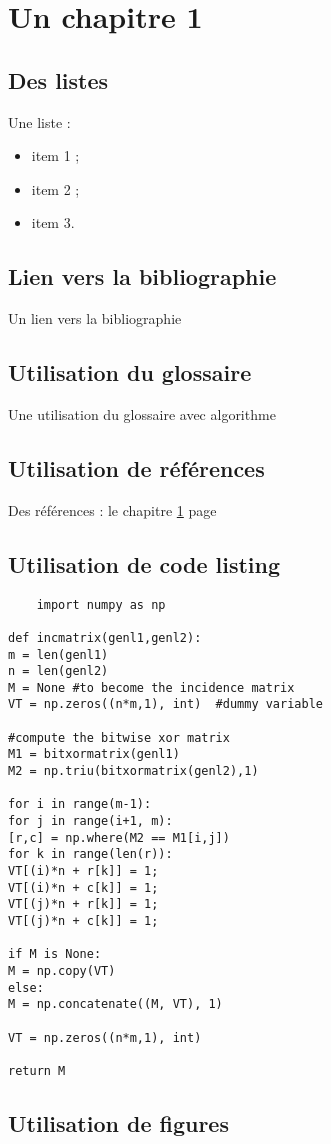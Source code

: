 \chapter{Un chapitre 1}
\label{ch:chapitre 1}

\section{Des listes}

Une liste :
\begin{itemize}
    \item item 1 ;
    \item item 2 ;
    \item item 3.
\end{itemize}

\section{Lien vers la bibliographie}

Un lien vers la bibliographie

\section{Utilisation du glossaire}

Une utilisation du glossaire avec \gls{algorithme}

\section{Utilisation de références}

Des références : le chapitre \ref{ch:chapitre 1} page \pageref{ch:chapitre 1}

\section{Utilisation de code listing}

\begin{lstlisting}
    import numpy as np

def incmatrix(genl1,genl2):
m = len(genl1)
n = len(genl2)
M = None #to become the incidence matrix
VT = np.zeros((n*m,1), int)  #dummy variable

#compute the bitwise xor matrix
M1 = bitxormatrix(genl1)
M2 = np.triu(bitxormatrix(genl2),1)

for i in range(m-1):
for j in range(i+1, m):
[r,c] = np.where(M2 == M1[i,j])
for k in range(len(r)):
VT[(i)*n + r[k]] = 1;
VT[(i)*n + c[k]] = 1;
VT[(j)*n + r[k]] = 1;
VT[(j)*n + c[k]] = 1;

if M is None:
M = np.copy(VT)
else:
M = np.concatenate((M, VT), 1)

VT = np.zeros((n*m,1), int)

return M
\end{lstlisting}


\section{Utilisation de figures}

\begin{comment}
\begin{figure}
    \centering
    \texttt{[image: images/image]}
    \caption{Une image}
    \label{fig:image}
\end{figure}

\end{comment}

